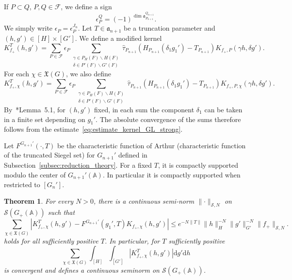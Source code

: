 \documentclass[letterpaper,11pt]{amsart}
\newcommand{\fa}{\mathfrak{a}}
\newcommand{\fX}{\mathfrak{X}}
\newcommand{\bA}{\mathbb{A}}
\newcommand{\cF}{\mathcal{F}}
\newcommand{\cS}{\mathcal{S}}
\newcommand{\rd}{\mathrm{d}}
\newcommand{\bs}{\backslash}
\newcommand{\<}{\negthickspace}
\providecommand{\aabs}[1]{\lVert#1\rVert}
\providecommand{\Abs}[1]{\left\lvert#1\right\rvert}
\theoremstyle{definition}
\theoremstyle{plain}
\newtheorem{theorem}[definition]{Theorem}
\theoremstyle{remark}
\numberwithin{equation}{section}
\begin{document}
If $P\subset Q$, $P, Q \in \cF$, we define a sign
    \[
    \epsilon_{P}^{Q} = (-1)^{\dim \fa^{Q_{n+1}}_{P_{n+1}}}.
    \]
We simply write $\epsilon_P = \epsilon_P^{J_n}$. Let $T \in
\fa_{n+1}$ be a truncation parameter and $(h, g') \in [H] \times [G']$. We
define a modified kernel
    \[
    K_{f_+}^T(h, g') = \sum_{P \in \cF}
    \epsilon_P \sum_{\substack{\gamma \in P_H(F) \bs H(F)\\
    \delta \in P'(F) \bs G'(F)}}
    \widehat{\tau}_{P_{n+1}}(H_{P_{n+1}}(\delta_1 g_1') - T_{P_{n+1}})
    K_{f_+, P}(\gamma h, \delta g').
    \]
For each $\chi \in \fX(G)$, we also define
    \[
    K_{f_+, \chi}^T(h, g') = \sum_{P \in \cF}
    \epsilon_P \sum_{\substack{\gamma \in P_H(F) \bs H(F)\\
    \delta \in P'(F) \bs G'(F)}}
    \widehat{\tau}_{P_{n+1}}(H_{P_{n+1}}(\delta_1 g_1') - T_{P_{n+1}})
    K_{f_+, P, \chi}(\gamma h, \delta g').
    \]
By~\cite{Arthur3}*{Lemma~5.1}, for $(h,g')$ fixed, in each sum the component $\delta_1$ can be taken in a finite
set depending on $g_1'$. The absolute convergence of the sums therefore follows from the
estimate~\eqref{eq:estimate_kernel_GL_strong}.


Let $F^{G_{n+1}'}(\cdot, T)$ be the characteristic function of Arthur
(characteristic function of the truncated Siegel set) for $G_{n+1}'$ defined
in Subsection~\ref{subsec:reduction_theory}. For a fixed $T$, it is
compactly supported modulo the center of $G_{n+1}'(\bA)$. In particular it is
compactly supported when restricted to $[G_{n}']$.

\begin{theorem} \label{thm:convergence_first_GL}
For every $N>0$, there is a continuous semi-norm $\aabs{\cdot}_{\cS, N}$ on
$\cS(G_+(\bA))$ such that
    \begin{equation}    \label{eq:asymptotics_first_GL}
    \sum_{\chi \in \fX(G)} \Abs{ K_{f_+, \chi}^T(h, g') -
    F^{G_{n+1}'}(g_1', T) K_{f_+, \chi}(h, g')} \le e^{-N\| T \|}
    \aabs{h}_{H}^{-N}
    \aabs{g'}_{G'}^{-N} \aabs{f_+}_{\cS, N}.
    \end{equation}
holds for all sufficiently positive $T$. In particular, for $T$ sufficiently
positive
    \[
    \sum_{\chi \in \fX(G)} \int_{[H]} \int_{[G']}
     \left| K_{f_+, \chi}^T(h, g') \right|
    \rd g' \rd h
    \]
is convergent and defines a continuous seminorm on $\cS(G_+(\bA))$.
\end{theorem}
\end{document}
